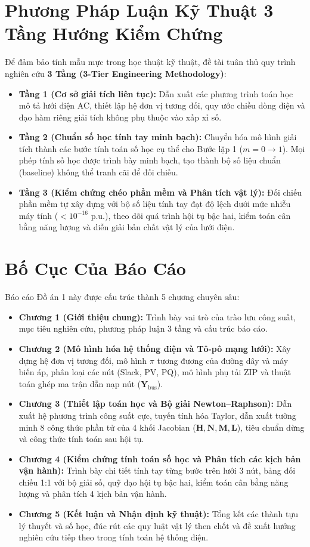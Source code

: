 \documentclass[12pt,a4paper,oneside]{report}
\begin{document}
\section{Phương Pháp Luận Kỹ Thuật 3 Tầng Hướng Kiểm Chứng}
Để đảm bảo tính mẫu mực trong học thuật kỹ thuật, đề tài tuân thủ quy trình nghiên cứu \textbf{3 Tầng (3-Tier Engineering Methodology)}:
\begin{itemize}
    \item \textbf{Tầng 1 (Cơ sở giải tích liên tục):} Dẫn xuất các phương trình toán học mô tả lưới điện AC, thiết lập hệ đơn vị tương đối, quy ước chiều dòng điện và đạo hàm riêng giải tích không phụ thuộc vào xấp xỉ số.
    \item \textbf{Tầng 2 (Chuẩn số học tính tay minh bạch):} Chuyển hóa mô hình giải tích thành các bước tính toán số học cụ thể cho Bước lặp 1 ($m = 0 \to 1$). Mọi phép tính số học được trình bày minh bạch, tạo thành bộ số liệu chuẩn (baseline) không thể tranh cãi để đối chiếu.
    \item \textbf{Tầng 3 (Kiểm chứng chéo phần mềm và Phân tích vật lý):} Đối chiếu phần mềm tự xây dựng với bộ số liệu tính tay đạt độ lệch dưới mức nhiễu máy tính ($< 10^{-16}\text{ p.u.}$), theo dõi quá trình hội tụ bậc hai, kiểm toán cân bằng năng lượng và diễn giải bản chất vật lý của lưới điện.
\end{itemize}

\section{Bố Cục Của Báo Cáo}
Báo cáo Đồ án 1 này được cấu trúc thành 5 chương chuyên sâu:
\begin{itemize}
    \item \textbf{Chương 1 (Giới thiệu chung):} Trình bày vai trò của trào lưu công suất, mục tiêu nghiên cứu, phương pháp luận 3 tầng và cấu trúc báo cáo.
    \item \textbf{Chương 2 (Mô hình hóa hệ thống điện và Tô-pô mạng lưới):} Xây dựng hệ đơn vị tương đối, mô hình $\pi$ tương đương của đường dây và máy biến áp, phân loại các nút (Slack, PV, PQ), mô hình phụ tải ZIP và thuật toán ghép ma trận dẫn nạp nút ($\mathbf{Y}_{\text{bus}}$).
    \item \textbf{Chương 3 (Thiết lập toán học và Bộ giải Newton--Raphson):} Dẫn xuất hệ phương trình công suất cực, tuyến tính hóa Taylor, dẫn xuất tường minh 8 công thức phần tử của 4 khối Jacobian ($\mathbf{H}, \mathbf{N}, \mathbf{M}, \mathbf{L}$), tiêu chuẩn dừng và công thức tính toán sau hội tụ.
    \item \textbf{Chương 4 (Kiểm chứng tính toán số học và Phân tích các kịch bản vận hành):} Trình bày chi tiết tính tay từng bước trên lưới 3 nút, bảng đối chiếu 1:1 với bộ giải số, quỹ đạo hội tụ bậc hai, kiểm toán cân bằng năng lượng và phân tích 4 kịch bản vận hành.
    \item \textbf{Chương 5 (Kết luận và Nhận định kỹ thuật):} Tổng kết các thành tựu lý thuyết và số học, đúc rút các quy luật vật lý then chốt và đề xuất hướng nghiên cứu tiếp theo trong tính toán hệ thống điện.
\end{itemize}
\end{document}
